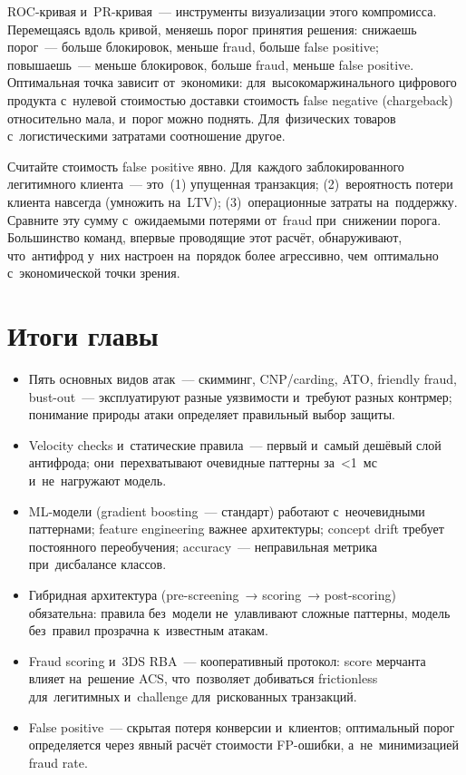 ROC-кривая и~PR-кривая~--- инструменты визуализации этого компромисса.
Перемещаясь вдоль кривой, меняешь порог принятия решения: снижаешь
порог~--- больше блокировок, меньше fraud, больше false positive; повышаешь~---
меньше блокировок, больше fraud, меньше false positive. Оптимальная
точка зависит от~экономики: для~высокомаржинального цифрового продукта
с~нулевой стоимостью доставки стоимость false negative (chargeback)
относительно мала, и~порог можно поднять. Для~физических товаров с~логистическими
затратами соотношение другое.

\begin{practice}
  Считайте стоимость false positive явно. Для~каждого заблокированного
  легитимного клиента~--- это~(1) упущенная транзакция; (2)~вероятность
  потери клиента навсегда (умножить на~LTV); (3)~операционные затраты
  на~поддержку. Сравните эту сумму с~ожидаемыми потерями от~fraud при~снижении
  порога. Большинство команд, впервые проводящие этот расчёт, обнаруживают,
  что~антифрод у~них настроен на~порядок более агрессивно, чем~оптимально
  с~экономической точки зрения.
\end{practice}


\section*{Итоги главы}

\begin{itemize}
  \item Пять основных видов атак~--- скимминг, CNP/carding, ATO,
        friendly fraud, bust-out~--- эксплуатируют разные уязвимости
        и~требуют разных контрмер; понимание природы атаки определяет
        правильный выбор защиты.
  \item Velocity checks и~статические правила~--- первый и~самый
        дешёвый слой антифрода; они~перехватывают очевидные паттерны
        за~<1~мс и~не~нагружают модель.
  \item ML-модели (gradient boosting~--- стандарт) работают с~неочевидными
        паттернами; feature engineering важнее архитектуры; concept
        drift требует постоянного переобучения; accuracy~--- неправильная
        метрика при~дисбалансе классов.
  \item Гибридная архитектура (pre-screening~→ scoring~→ post-scoring)
        обязательна: правила без~модели не~улавливают сложные паттерны,
        модель без~правил прозрачна к~известным атакам.
  \item Fraud scoring и~3DS RBA~--- кооперативный протокол: score
        мерчанта влияет на~решение ACS, что~позволяет добиваться
        frictionless для~легитимных и~challenge для~рискованных транзакций.
  \item False positive~--- скрытая потеря конверсии и~клиентов; оптимальный
        порог определяется через явный расчёт стоимости FP-ошибки,
        а~не~минимизацией fraud rate.
\end{itemize}
